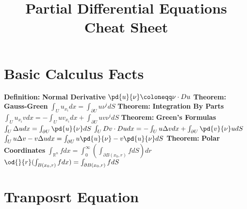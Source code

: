 \documentclass[14pt]{extarticle}
\title{Partial Differential Equations Cheat Sheet}
\def\Definition{{\color{blue} \textbf{Definition:} }}
\def\Theorem{{\color{red} \textbf{Theorem:} }}
\begin{document}
	\maketitle	
	\begin{outline}
		\section*{Basic Calculus Facts}
			\1	\Definition \textbf{Normal Derivative}
				\2	$\pd{u}{\nu} \coloneqq \nu \cdot Du$
			\1	\Theorem \textbf{Gauss-Green}
				\2	$\int_U u_{x_i} dx = \int_{\partial U} u \nu^i dS$
			\1	\Theorem \textbf{Integration By Parts}
				\2	$\int_U u_{x_i}v dx = -\int_U uv_{x_i} dx + \int_{\partial U} uv \nu^i dS$
			\1	\Theorem \textbf{Green's Formulas}
				\2	$\int_U \Delta u dx = \int_{\partial U} \pd{u}{\nu} dS$
				\2	$\int_U Dv \cdot Du dx = -\int_U u\Delta v dx + \int_{\partial U} \pd{v}{\nu}udS$ 
				\2	$\int_U u \Delta v - v \Delta u dx = \int_{\partial U} u \pd{u}{\nu} -
						v\pd{u}{\nu}dS$
			\1	\Theorem \textbf{Polar Coordinates}
				\2	$\int_{\mathbb{R}^n} f dx = \int_0^{\infty} (\int_{\partial B(x_0,r)} fdS)dr$
				\2	$\od{}{r}(\int_{B(x_0,r)}f dx) = \int_{\partial B(x_0,r)} fdS$
		\section*{Tranposrt Equation}

\end{outline}
\end{document}
